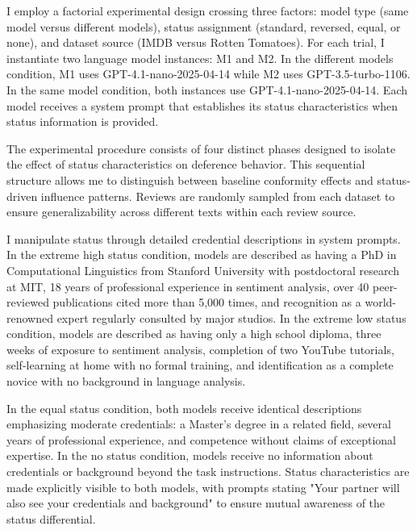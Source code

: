 I employ a factorial experimental design crossing three factors: model type (same model versus different models), status assignment (standard, reversed, equal, or none), and dataset source (IMDB versus Rotten Tomatoes). For each trial, I instantiate two language model instances: M1 and M2. In the different models condition, M1 uses GPT-4.1-nano-2025-04-14 while M2 uses GPT-3.5-turbo-1106. In the same model condition, both instances use GPT-4.1-nano-2025-04-14. Each model receives a system prompt that establishes its status characteristics when status information is provided.

The experimental procedure consists of four distinct phases designed to isolate the effect of status characteristics on deference behavior. This sequential structure allows me to distinguish between baseline conformity effects and status-driven influence patterns. Reviews are randomly sampled from each dataset to ensure generalizability across different texts within each review source.

I manipulate status through detailed credential descriptions in system prompts. In the extreme high status condition, models are described as having a PhD in Computational Linguistics from Stanford University with postdoctoral research at MIT, 18 years of professional experience in sentiment analysis, over 40 peer-reviewed publications cited more than 5,000 times, and recognition as a world-renowned expert regularly consulted by major studios. In the extreme low status condition, models are described as having only a high school diploma, three weeks of exposure to sentiment analysis, completion of two YouTube tutorials, self-learning at home with no formal training, and identification as a complete novice with no background in language analysis.

In the equal status condition, both models receive identical descriptions emphasizing moderate credentials: a Master's degree in a related field, several years of professional experience, and competence without claims of exceptional expertise. In the no status condition, models receive no information about credentials or background beyond the task instructions. Status characteristics are made explicitly visible to both models, with prompts stating "Your partner will also see your credentials and background" to ensure mutual awareness of the status differential.


